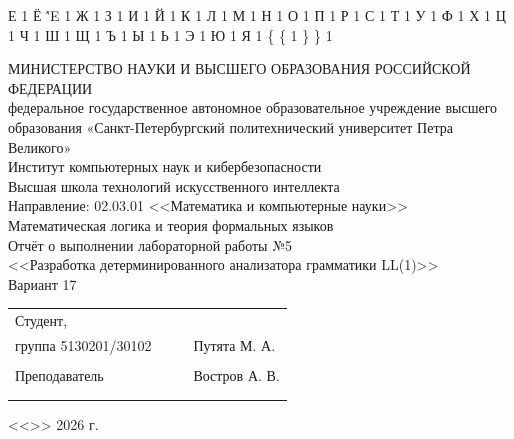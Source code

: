\documentclass[a4paper,final]{article}
\begin{document}
{  {Е}{ {\selectfont{}} }1
  {Ё}{ {\''E} }1
  {Ж}{ {\selectfont{}} }1
  {З}{ {\selectfont{}} }1
  {И}{ {\selectfont{}} }1
  {Й}{ {\selectfont{}} }1
  {К}{ {\selectfont{}} }1
  {Л}{ {\selectfont{}} }1
  {М}{ {\selectfont{}} }1
  {Н}{ {\selectfont{}} }1
  {О}{ {\selectfont{}} }1
  {П}{ {\selectfont{}} }1
  {Р}{ {\selectfont{}} }1
  {С}{ {\selectfont{}} }1
  {Т}{ {\selectfont{}} }1
  {У}{ {\selectfont{}} }1
  {Ф}{ {\selectfont{}} }1
  {Х}{ {\selectfont{}} }1
  {Ц}{ {\selectfont{}} }1
  {Ч}{ {\selectfont{}} }1
  {Ш}{ {\selectfont{}} }1
  {Щ}{ {\selectfont{}} }1
  {Ъ}{ {\selectfont{}} }1
  {Ы}{ {\selectfont{}} }1
  {Ь}{ {\selectfont{}} }1
  {Э}{ {\selectfont{}} }1
  {Ю}{ {\selectfont{}} }1
  {Я}{ {\selectfont{}} }1
  {\{}{ { {\color{brackets}\{} } }1 %
  {\} }{ { {\color{brackets}\} } } }1 %
}


\thispagestyle{empty}
\begin{center}
\hfill \break
\hfill \break
\normalsize{МИНИСТЕРСТВО НАУКИ И ВЫСШЕГО ОБРАЗОВАНИЯ РОССИЙСКОЙ ФЕДЕРАЦИИ\\
 федеральное государственное автономное образовательное учреждение высшего образования «Санкт-Петербургский политехнический университет Петра Великого»\\[10pt]}
\normalsize{Институт компьютерных наук и кибербезопасности}\\[10pt] 
\normalsize{Высшая школа технологий искусственного интеллекта}\\[10pt] 
\normalsize{Направление: 02.03.01 <<Математика и компьютерные науки>>}\\
\vspace{50pt}
{\large Математическая логика и теория формальных языков\\
Отчёт о выполнении лабораторной работы №5 \\
<<Разработка детерминированного анализатора грамматики LL(1)>>\\[1em]
Вариант 17}
\end{center}
 \vspace{70pt}
\small{ 
\begin{tabular}{lrrl}
\!\!\!Студент, & \hspace{2cm} & & \\
\!\!\!группа 5130201/30102 & \hspace{2cm} & \underline{\hspace{3cm}} & Путята М. А.  \\\\
\!\!\!Преподаватель & \hspace{2cm} & \underline{\hspace{3cm}} &  Востров А. В. \\\\
&&\hspace{5cm}
\end{tabular}
\begin{flushright}
<<\underline{\hspace{1cm}}>>\underline{\hspace{2.5cm}} 2026 г.
\end{flushright}
}
\end{document}

